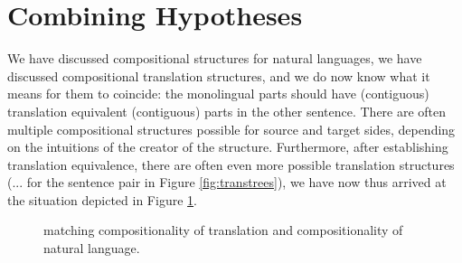 \documentclass{report}
\theoremstyle{break}
\begin{document}
\section{Combining Hypotheses}

We have discussed compositional structures for natural languages, we have discussed compositional translation structures, and we do now know what it means for them to coincide: the monolingual parts should have (contiguous) translation equivalent (contiguous) parts in the other sentence. There are often multiple compositional structures possible for source and target sides, depending on the intuitions of the creator of the structure. Furthermore, after establishing translation equivalence, there are often even more possible translation structures (... for the sentence pair in Figure \ref{fig:transtrees}), we have now thus arrived at the situation depicted in Figure  \ref{fig:comp2x}.

\begin{figure}[!ht]
\centering
{}
\caption{matching compositionality of translation and compositionality of natural language.}\label{fig:comp2x}
\end{figure}
\end{document}
